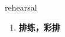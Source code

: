 
\begin{frame}
{\huge rehearsal}
\begin{center}
\begin{enumerate}\Large
  \item \textbf{排练，彩排}
\end{enumerate}
\end{center}
\end{frame}
